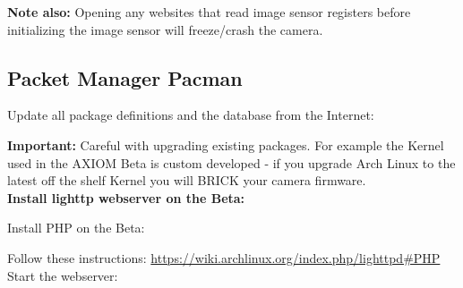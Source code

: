 \textbf{Note also:} Opening any websites that read image sensor registers before initializing the image sensor  will freeze/crash the camera. 






\subsection{Packet Manager Pacman}

Update all package definitions and the database from the Internet: 


\textbf{Important:} Careful with upgrading existing packages. For example the Kernel used in the AXIOM Beta is custom developed - if you upgrade Arch Linux to the latest off the shelf Kernel you will BRICK your camera firmware.\\

\textbf{Install lighttp webserver on the Beta: }


Install PHP on the Beta: 


Follow these instructions: \href{https://wiki.archlinux.org/index.php/lighttpd#PHP}{https://wiki.archlinux.org/index.php/lighttpd#PHP}\\

Start the webserver: 

